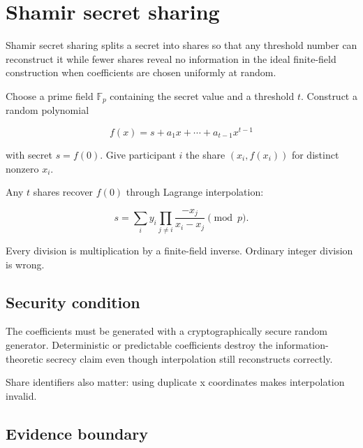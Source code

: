 \hypertarget{appendix-5888fd6102dc}{}\label{referencestart:appendix-5888fd6102dc}
\section{Shamir secret sharing}\label{appendix-5888fd6102dc-shamir-secret-sharing}

\hypertarget{appendix-5888fd6102dc-shamir-secret-sharing}{}

Shamir secret sharing splits a secret into shares so that any threshold number can reconstruct it while fewer shares reveal no information in the ideal finite-field construction when coefficients are chosen uniformly at random.

Choose a prime field \(\mathbb F_p\) containing the secret value and a threshold \(t\). Construct a random polynomial

\[
f(x)=s+a_1x+\cdots+a_{t-1}x^{t-1}
\]

with secret \(s=f(0)\). Give participant \(i\) the share \((x_i,f(x_i))\) for distinct nonzero \(x_i\).

Any \(t\) shares recover \(f(0)\) through Lagrange interpolation:

\[
s=
\sum_i y_i
\prod_{j\ne i}
\frac{-x_j}{x_i-x_j}
\pmod p.
\]

Every division is multiplication by a finite-field inverse. Ordinary integer division is wrong.

\subsection{Security condition}\label{appendix-5888fd6102dc-security-condition}

\hypertarget{appendix-5888fd6102dc-security-condition}{}

The coefficients must be generated with a cryptographically secure random generator. Deterministic or predictable coefficients destroy the information-theoretic secrecy claim even though interpolation still reconstructs correctly.

Share identifiers also matter: using duplicate x coordinates makes interpolation invalid.

\subsection{Evidence boundary}\label{appendix-5888fd6102dc-evidence-boundary}

\hypertarget{appendix-5888fd6102dc-evidence-boundary}{}

